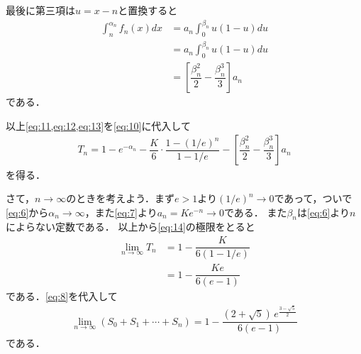 \documentclass[../../main.tex]{subfiles}
\begin{document}
最後に第三項は$u=x-n$と置換すると
\begin{align}
  \int_n^{\alpha_n}f_n(x)dx
  &=a_n\int_{0}^{\beta_n} u(1-u)du \\
  &=a_n\int_{0}^{\beta_n} u(1-u)du \\
  &=\left[\dfrac{\beta_n^2}{2}-\dfrac{\beta_n^3}{3}\right]a_n \label{eq:13}
\end{align}
である．

以上\cref{eq:11,eq:12,eq:13}を\cref{eq:10}に代入して
\begin{align}
  T_n=1-e^{-\alpha_n}-\dfrac{K}{6}\cdot\dfrac{1-(1/e)^n}{1-1/e}-\left[\dfrac{\beta_n^2}{2}-\dfrac{\beta_n^3}{3}\right]a_n \label{eq:14}
\end{align}
を得る．

さて，$n\to\infty$のときを考えよう．まず$e>1$より$(1/e)^n\to0$であって，ついで\cref{eq:6}から$\alpha_n\to\infty$，また\cref{eq:7}より$a_n=Ke^{-n}\to 0$である．
また$\beta_n$は\cref{eq:6}より$n$によらない定数である．
以上から\cref{eq:14}の極限をとると
\begin{align}
  \lim_{n\to\infty}T_n
  &=1-\dfrac{K}{6(1-1/e)} \\
  &=1-\dfrac{Ke}{6(e-1)}
\end{align}
である．\cref{eq:8}を代入して
\begin{align}
  \lim_{n\to\infty}(S_0+S_1+\cdots+S_n)=1-\dfrac{(2+\sqrt{5})\,e^{\frac{3-\sqrt{5}}{2}}}{6(e-1)}
\end{align}
である．
\end{document}
